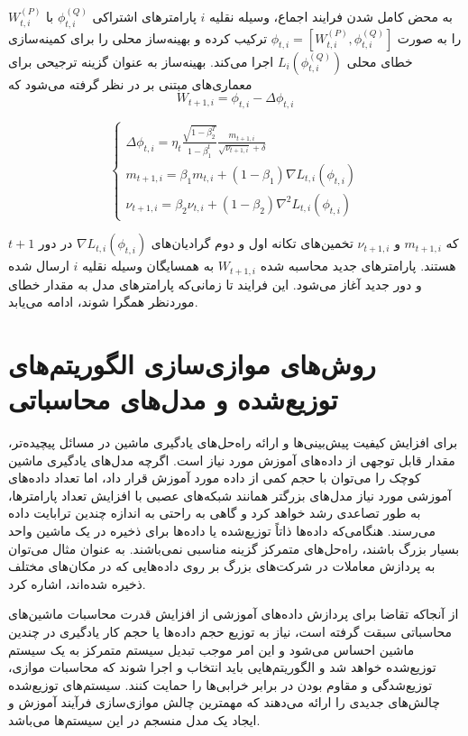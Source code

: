 به محض کامل شدن فرایند اجماع، وسیله نقلیه $i$ پارامترهای اشتراکی $\phi_{t,i}^{(Q)} $ با $W_{t,i}^{(P)} $ را به صورت $\phi_{t,i}=[W_{t,i}^{(P)}, \phi_{t,i}^{(Q)}]$ ترکیب کرده و بهینه‌ساز محلی را برای کمینه‌سازی خطای محلی $L_i(\phi_{t,i}^{(Q)})$ اجرا می‌کند. بهینه‌ساز  به عنوان گزینه ترجیحی برای معماری‌های مبتنی بر  در نظر گرفته می‌شود که
\begin{equation}\label{e138}
W_{t+1,i}=\phi_{t,i}-\Delta \phi_{t,i}
\end{equation}

\begin{equation}\label{e139}
	\begin{cases}
		\Delta\phi_{t,i}=\eta_t\frac{\sqrt{1-\beta_2^T}}{1-\beta_1^t}\frac{m_{t+1,i}}{\sqrt{\nu_{t+1,i}}+\delta}\\
		m_{t+1,i}=\beta_1 m_{t,i}+(1-\beta_1)\nabla L_{t,i}(\phi_{t,i})\\
		\nu_{t+1,i}=\beta_2\nu_{t,i}+(1-\beta_2)\nabla^2 L_{t,i}(\phi_{t,i})
	\end{cases}
\end{equation}

که $m_{t+1,i}$ و $\nu_{t+1,i}$ تخمین‌های تکانه اول و دوم گرادیان‌های $\nabla L_{t,i}(\phi_{t,i})$ در دور $t+1$ هستند. پارامترهای جدید محاسبه شده $W_{t+1,i}$ به همسایگان وسیله نقلیه $i$ ارسال شده و دور جدید آغاز می‌شود. این فرایند تا زمانی‌که پارامترهای مدل به مقدار خطای موردنظر همگرا شوند، ادامه می‌یابد. 

\section{روش‌های موازی‌سازی‌ الگوریتم‌های توزیع‌شده و مدل‌های محاسباتی}
برای افزایش کیفیت پیش‌بینی‌ها و ارائه راه‌حل‌های یادگیری ماشین در مسائل پیچیده‌تر، مقدار قابل توجهی از داده‌های آموزش مورد نیاز است. اگرچه مدل‌های یادگیری ماشین کوچک را می‌توان با حجم کمی از داده مورد آموزش قرار داد، اما تعداد داده‌های آموزشی مورد نیاز مدل‌های بزرگتر همانند شبکه‌های عصبی با افزایش تعداد پارامترها، به طور تصاعدی رشد خواهد کرد و گاهی به راحتی به اندازه چندین ترابایت داده می‌رسند. هنگامی‌که داده‌ها ذاتاً توزیع‌شده یا داده‌ها برای ذخیره در یک ماشین واحد بسیار بزرگ باشند، راه‌حل‌های متمرکز گزینه مناسبی نمی‌باشند. به عنوان مثال می‌توان به پردازش معاملات در شرکت‌های بزرگ بر روی داده‌هایی که در مکان‌های مختلف ذخیره شده‌اند، اشاره کرد.

از آنجاکه تقاضا برای پردازش داده‌های آموزشی از افزایش قدرت محاسبات ماشین‌های محاسباتی سبقت گرفته است، نیاز به توزیع حجم داده‌ها یا حجم کار یادگیری در چندین ماشین احساس می‌شود و این امر موجب تبدیل سیستم متمرکز به یک سیستم توزیع‌شده خواهد شد و الگوریتم‌هایی باید انتخاب و اجرا شوند که محاسبات موازی، توزیع‌شدگی و مقاوم بودن در برابر خرابی‌ها را حمایت کنند. سیستم‌های توزیع‌شده چالش‌های جدیدی را ارائه می‌دهند که مهمترین چالش موازی‌سازی فرآیند آموزش و ایجاد یک مدل منسجم در این سیستم‌ها می‌باشد. 


